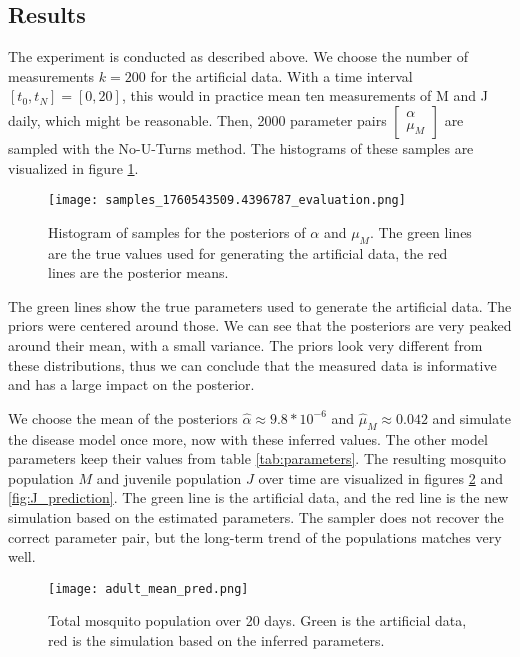 \documentclass{article}
\begin{document}
\subsection{Results}
The experiment is conducted as described above. We choose the number of measurements $k=200$ for the artificial data. With a time interval $[t_0,t_N]=[0,20]$, this would in practice mean ten measurements of M and J daily, which might be reasonable. Then, 2000 parameter pairs $\begin{bmatrix}\alpha \\ \mu_M\end{bmatrix}$ are sampled with the No-U-Turns method. The histograms of these samples are visualized in figure \ref{fig:samples_hist}. 

\begin{figure}
    \hspace*{-3cm}
    \texttt{[image: samples\_1760543509.4396787\_evaluation.png]}
    \caption{Histogram of samples for the posteriors of $\alpha$ and $\mu_M$. The green lines are the true values used for generating the artificial data, the red lines are the posterior means.}
    \label{fig:samples_hist}
\end{figure}

The green lines show the true parameters used to generate the artificial data. The priors were centered around those. We can see that the posteriors are very peaked around their mean, with a small variance. The priors look very different from these distributions, thus we can conclude that the measured data is informative and has a large impact on the posterior.

We choose the mean of the posteriors $\hat\alpha \approx 9.8 * 10^{-6}$ and $\hat\mu_M \approx 0.042$ and simulate the disease model once more, now with these inferred values. The other model parameters keep their values from table \ref{tab:parameters}. The resulting mosquito population $M$ and juvenile population $J$ over time are visualized in figures \ref{fig:M_prediction} and \ref{fig:J_prediction}. The green line is the artificial data, and the red line is the new simulation based on the estimated parameters. The sampler does not recover the correct parameter pair, but the long-term trend of the populations matches very well.
\begin{figure}
    \centering
    \texttt{[image: adult\_mean\_pred.png]}
    \caption{Total mosquito population over 20 days. Green is the artificial data, red is the simulation based on the inferred parameters.}
    \label{fig:M_prediction}
\end{figure}
\end{document}
